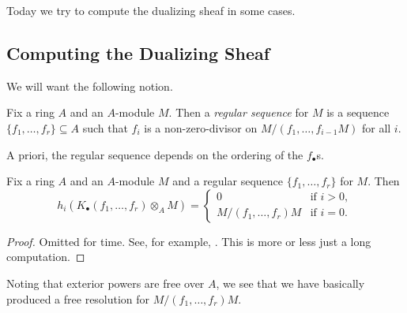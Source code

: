 \documentclass[../notes.tex]{subfiles}
\begin{document}
Today we try to compute the dualizing sheaf in some cases.

\subsection{Computing the Dualizing Sheaf}
We will want the following notion.
\begin{definition}[regular]
	Fix a ring $A$ and an $A$-module $M$. Then a \textit{regular sequence} for $M$ is a sequence $\{f_1,\ldots,f_r\}\subseteq A$ such that $f_i$ is a non-zero-divisor on $M/(f_1,\ldots,f_{i-1}M)$ for all $i$.
\end{definition}
A priori, the regular sequence depends on the ordering of the $f_\bullet$s.
\begin{proposition}
	Fix a ring $A$ and an $A$-module $M$ and a regular sequence $\{f_1,\ldots,f_r\}$ for $M$. Then
	\[h_i(K_\bullet(f_1,\ldots,f_r)\otimes_AM)=\begin{cases}
		0 & \text{if }i>0, \\
		M/(f_1,\ldots,f_r)M & \text{if }i=0.
	\end{cases}\]
\end{proposition}
\begin{proof}
	Omitted for time. See, for example, \cite[Section~17.5]{eisenbud-comm-alg}. This is more or less just a long computation.
\end{proof}
Noting that exterior powers are free over $A$, we see that we have basically produced a free resolution for $M/(f_1,\ldots,f_r)M$.
\end{document}
